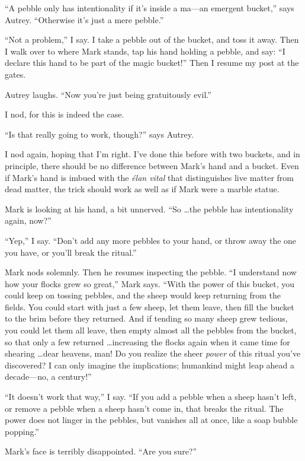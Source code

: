 {
 ``A pebble only has intentionality if
it's inside a ma---an emergent
bucket,'' says Autrey. ``Otherwise
it's just a mere pebble.''}

{
 ``Not a problem,'' I say. I
take a pebble out of the bucket, and toss it away. Then I walk over to
where Mark stands, tap his hand holding a pebble, and say:
``I declare this hand to be part of the magic
bucket!'' Then I resume my post at the gates.}

{
 Autrey laughs. ``Now you're just
being gratuitously evil.''}

{
 I nod, for this is indeed the case.}

{
 ``Is that really going to work,
though?'' says Autrey.}

{
 I nod again, hoping that I'm right.
I've done this before with two buckets, and in
principle, there should be no difference between Mark's
hand and a bucket. Even if Mark's hand is imbued with
the \textit{élan vital} that distinguishes live matter from dead
matter, the trick should work as well as if Mark were a marble statue.}

{
 Mark is looking at his hand, a bit unnerved. ``So
\ldots the pebble has intentionality again, now?''}

{
 ``Yep,'' I say.
``Don't add any more pebbles to your
hand, or throw away the one you have, or you'll break
the ritual.''}

{
 Mark nods solemnly. Then he resumes inspecting the pebble.
``I understand now how your flocks grew so
great,'' Mark says. ``With the power
of this bucket, you could keep on tossing pebbles, and the sheep would
keep returning from the fields. You could start with just a few sheep,
let them leave, then fill the bucket to the brim before they returned.
And if tending so many sheep grew tedious, you could let them all
leave, then empty almost all the pebbles from the bucket, so that only
a few returned \ldots increasing the flocks again when it came time for
shearing \ldots dear heavens, man! Do you realize the sheer
\textit{power} of this ritual you've discovered? I can
only imagine the implications; humankind might leap ahead a
decade---no, a century!''}

{
 ``It doesn't work that
way,'' I say. ``If you add a pebble
when a sheep hasn't left, or remove a pebble when a
sheep hasn't come in, that breaks the ritual. The power
does not linger in the pebbles, but vanishes all at once, like a soap
bubble popping.''}

{
 Mark's face is terribly disappointed.
``Are you sure?''}

